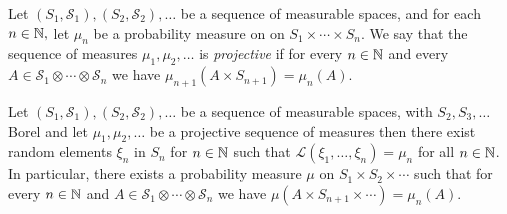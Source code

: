 \begin{defn}Let $(S_1, \mathcal{S}_1), (S_2, \mathcal{S}_2), \dotsc$ be a sequence of measurable spaces,
  and for each $n \in \mathbb{N}, $ let  $\mu_n$ be a probability
  measure on on $S_1 \times \dotsb \times S_n$.  We say that the
  sequence of measures $\mu_1, \mu_2, \dotsc$ is \emph{projective} if
  for every $n \in \mathbb{N}$ and every $A \in \mathcal{S}_1 \otimes
  \dotsb \otimes \mathcal{S}_n$ we have $\mu_{n+1}(A \times S_{n+1}) =
  \mu_n(A)$.
\end{defn}

\begin{thm}\label{DaniellExtension}Let $(S_1,
  \mathcal{S}_1), (S_2, \mathcal{S}_2), \dotsc$ be a sequence of
  measurable spaces, with $S_2, S_3 , \dotsc$ Borel and let $\mu_1,
  \mu_2, \dotsc$ be a projective sequence of measures then there exist
  random elements $\xi_n$ in $S_n$ for $n \in \mathbb{N}$ such that
  $\mathcal{L}(\xi_1, \dotsc, \xi_n) = \mu_n$ for all $n \in
  \mathbb{N}$.  In particular, there exists a probability measure $\mu$
  on $S_1 \times S_2 \times \dotsb$ such that for every $n \in
  \mathbb{N}$ and $A \in \mathcal{S}_1 \otimes \dotsb \otimes
  \mathcal{S}_n$ we have $\mu(A \times S_{n+1} \times \dotsb) = \mu_n(A)$.
\end{thm}

